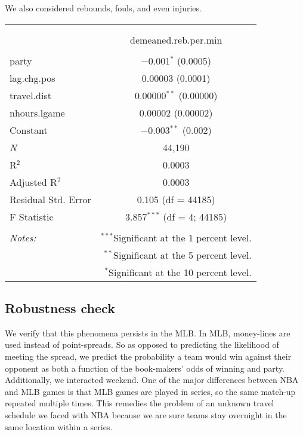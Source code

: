\documentclass[letterpaper,12pt]{article}
\begin{document}
We also considered rebounds, fouls, and even injuries. 
\begin{center}
    \begin{tabular}{@{\extracolsep{5pt}}lc}  \\[-1.8ex]\hline  \hline \\[-1.8ex]  \\[-1.8ex] & demeaned.reb.per.min \\  \hline \\[-1.8ex]   party & $-$0.001$^{*}$ (0.0005) \\    lag.chg.pos & 0.00003 (0.0001) \\    travel.dist & 0.00000$^{**}$ (0.00000) \\    nhours.lgame & 0.00002 (0.00002) \\    Constant & $-$0.003$^{**}$ (0.002) \\   \textit{N} & 44,190 \\  R$^{2}$ & 0.0003 \\  Adjusted R$^{2}$ & 0.0003 \\  Residual Std. Error & 0.105 (df = 44185) \\  F Statistic & 3.857$^{***}$ (df = 4; 44185) \\  \hline  \hline \\[-1.8ex]  \textit{Notes:} & \multicolumn{1}{r}{$^{***}$Significant at the 1 percent level.} \\   & \multicolumn{1}{r}{$^{**}$Significant at the 5 percent level.} \\   & \multicolumn{1}{r}{$^{*}$Significant at the 10 percent level.} \\  \end{tabular}  
\end{center}



\subsection{Robustness check}
We verify that this phenomena persists in the MLB. In MLB, money-lines
are used instead of point-spreads. So as opposed to predicting
the likelihood of meeting the spread, we predict the probability
a team would win against their opponent as both a function of the book-makers'
odds of winning and party. Additionally, we interacted weekend.
One of the major differences between NBA and MLB games is that MLB games
are played in series, so the same match-up repeated multiple times. This remedies
the problem of an unknown travel schedule we faced with NBA because we are sure 
teams stay overnight in the same location within a series.
\end{document}

